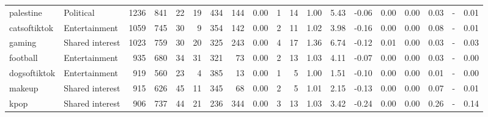 \begin{tabular}{llrrrrrrrrrrrrrrrrr}
       palestine &       Political &   1236 &    841 &                          22 &                           19 &           434 &                        144 &     0.00 &    1 &     14 & 1.00 &   5.43 &                              -0.06 &   0.00 &         0.00 &                                0.03 &                                    - &                                     0.01 \\
    catsoftiktok &   Entertainment &   1059 &    745 &                          30 &                            9 &           354 &                        142 &     0.00 &    2 &     11 & 1.02 &   3.98 &                              -0.16 &   0.00 &         0.00 &                                0.08 &                                    - &                                     0.01 \\
          gaming & Shared interest &   1023 &    759 &                          30 &                           20 &           325 &                        243 &     0.00 &    4 &     17 & 1.36 &   6.74 &                              -0.12 &   0.01 &         0.00 &                                0.03 &                                    - &                                     0.03 \\
        football &   Entertainment &    935 &    680 &                          34 &                           31 &           321 &                         73 &     0.00 &    2 &     13 & 1.03 &   4.11 &                              -0.07 &   0.00 &         0.00 &                                0.03 &                                    - &                                     0.00 \\
    dogsoftiktok &   Entertainment &    919 &    560 &                          23 &                            4 &           385 &                         13 &     0.00 &    1 &      5 & 1.00 &   1.51 &                              -0.10 &   0.00 &         0.00 &                                0.01 &                                    - &                                     0.00 \\
          makeup & Shared interest &    915 &    626 &                          45 &                           11 &           345 &                         68 &     0.00 &    2 &      5 & 1.01 &   2.15 &                              -0.13 &   0.00 &         0.00 &                                0.07 &                                    - &                                     0.01 \\
            kpop & Shared interest &    906 &    737 &                          44 &                           21 &           236 &                        344 &     0.00 &    3 &     13 & 1.03 &   3.42 &                              -0.24 &   0.00 &         0.00 &                                0.26 &                                    - &                                     0.14 \\

\end{tabular}
